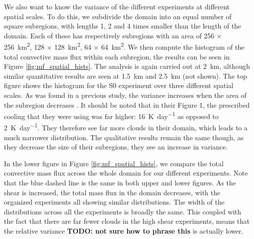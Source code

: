 \documentclass[11pt,a4paper]{article}
\newcommand\todo[1]{\textbf{TODO: #1}}
\begin{document}
%
We also want to know the variance of the different experiments at different spatial scales. To do this, we subdivide the domain into an equal number of square subregions, with lengths 1, 2 and 4 times smaller than the length of the domain. Each of these has respectively subregions with an area of \SI{256}{} $\times$ \SI{256}{km^2}, \SI{128}{} $\times$ \SI{128}{km^2}, \SI{64}{} $\times$ \SI{64}{km^2}. We then compute the histogram of the total convective mass flux within each subregion, the results can be seen in Figure \ref{fig:mf_spatial_hists}. The analysis is again carried out at \SI{2}{km}, although similar quantitative results are seen at \SI{1.5}{km} and \SI{2.5}{km} (not shown). The top figure shows the histogram for the S0 experiment over three different spatial scales. As was found in a previous study, the variance increases when the area of the subregion decreases \parencite{PC2008}. It should be noted that in their Figure 1, the prescribed cooling that they were using was far higher: \SI{16}{K.day^{-1}} as opposed to \SI{2}{K.day^{-1}}. They therefore see far more clouds in their domain, which leads to a much narrower distribution. The qualitative results remain the same though, as they decrease the size of their subregions, they see an increase in variance.

In the lower figure in Figure \ref{fig:mf_spatial_hists}, we compare the total convective mass flux across the whole domain for our different experiments. Note that the blue dashed line is the same in both upper and lower figures. As the shear is increased, the total mass flux in the domain decreases, with the organized experiments all showing similar distributions. The width of the distributions across all the experiments is broadly the same. This coupled with the fact that there are far fewer clouds in the high shear experiments, means that the relative variance \todo{not sure how to phrase this} is actually lower.
\end{document}
